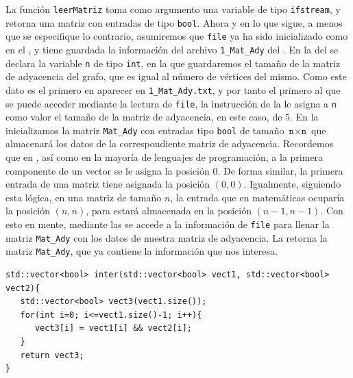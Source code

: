 La función \texttt{leerMatriz} toma como argumento una variable de tipo \texttt{ifstream}, y retorna una matriz con entradas de tipo \texttt{bool}. Ahora y en lo que sigue, a menos que se especifique lo contrario, asumiremos que \texttt{file} ya ha sido inicializado como en el , y tiene guardada la información del archivo \texttt{1\_Mat\_Ady} del . En la  del  se declara la variable \texttt{n} de tipo \texttt{int}, en la que guardaremos el tamaño de la matriz de adyacencia del grafo, que es igual al número de vértices del mismo. Como este dato es el primero en aparecer en \texttt{1\_Mat\_Ady.txt}, y por tanto el primero al que se puede acceder mediante la lectura de \texttt{file}, la instrucción de la  le asigna a \texttt{n} como valor el tamaño de la matriz de adyacencia, en este caso, de $5$. En la  inicializamos la matriz \texttt{Mat\_Ady} con entradas tipo \texttt{bool} de tamaño $\texttt{n}\times\texttt{n}$ que almacenará los datos de la correspondiente matriz de adyacencia. Recordemos que en \Cpp{}, así como en la mayoría de lenguajes de programación, a la primera componente de un vector se le asigna la posición $0$. De forma similar, la primera entrada de una matriz tiene asignada la posición $(0,0)$. Igualmente, siguiendo esta lógica, en una matriz de tamaño $n$, la entrada que en matemáticas ocuparía la posición $(n,n)$, para \Cpp{} estará almacenada en la posición $(n-1,n-1)$. Con esto en mente, mediante las  se accede a la información de \texttt{file} para llenar la matriz \texttt{Mat\_Ady} con los datos de nuestra matriz de adyacencia. La  retorna la matriz \texttt{Mat\_Ady}, que ya contiene la información que nos interesa.
\begin{lstlisting}[caption={Función \texttt{inter}}, label={cod:inter}]
std::vector<bool> inter(std::vector<bool> vect1, std::vector<bool> vect2){
   std::vector<bool> vect3(vect1.size());
   for(int i=0; i<=vect1.size()-1; i++){
      vect3[i] = vect1[i] && vect2[i];
   }
   return vect3;
}
\end{lstlisting}
